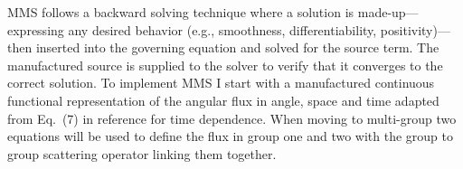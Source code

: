 MMS follows a backward solving technique where a solution is made-up---expressing any desired behavior (e.g., smoothness, differentiability, positivity)---then inserted into the governing equation and solved for the source term.
The manufactured source is supplied to the solver to verify that it converges to the correct solution. %
To implement MMS I start with a manufactured continuous functional representation of the angular flux in angle, space and time adapted from Eq.~(7) in reference \cite{wang_application_2018} for time dependence.
When moving to multi-group two equations will be used to define the flux in group one and two with the group to group scattering operator linking them together.

